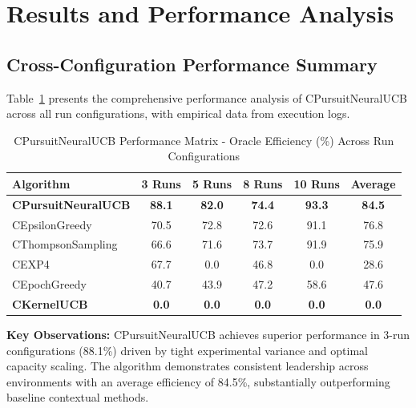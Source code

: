 \documentclass[12pt,a4paper]{article}
\newcommand{\primarytext}[1]{\textcolor{primaryblue}{\textbf{#1}}}
\newcommand{\warning}[1]{\textcolor{warningred}{\textbf{#1}}}
\begin{document}
\section{Results and Performance Analysis}

\begin{tcolorbox}[colback=tableheader,colframe=primaryblue,title=\textbf{Primary Performance Results - CPursuitNeuralUCB}]

\subsection{Cross-Configuration Performance Summary}

Table~\ref{tab:performance_matrix} presents the comprehensive performance analysis of CPursuitNeuralUCB across all run configurations, with empirical data from execution logs.

\begin{table}[H]
\centering
\caption{CPursuitNeuralUCB Performance Matrix - Oracle Efficiency (\%) Across Run Configurations}
\label{tab:performance_matrix}
\begin{tabular}{@{}lccccc@{}}
\toprule
\textbf{Algorithm} & \textbf{3 Runs} & \textbf{5 Runs} & \textbf{8 Runs} & \textbf{10 Runs} & \textbf{Average} \\
\midrule
\primarytext{CPursuitNeuralUCB} & \primarytext{88.1} & \primarytext{82.0} & \primarytext{74.4} & \primarytext{93.3} & \primarytext{84.5} \\
CEpsilonGreedy & 70.5 & 72.8 & 72.6 & 91.1 & 76.8 \\
CThompsonSampling & 66.6 & 71.6 & 73.7 & 91.9 & 75.9 \\
CEXP4 & 67.7 & 0.0 & 46.8 & 0.0 & 28.6 \\
CEpochGreedy & 40.7 & 43.9 & 47.2 & 58.6 & 47.6 \\
\warning{CKernelUCB} & \warning{0.0} & \warning{0.0} & \warning{0.0} & \warning{0.0} & \warning{0.0} \\
\bottomrule
\end{tabular}
\end{table}

\textbf{Key Observations:} CPursuitNeuralUCB achieves superior performance in 3-run configurations (88.1\%) driven by tight experimental variance and optimal capacity scaling. The algorithm demonstrates consistent leadership across environments with an average efficiency of 84.5\%, substantially outperforming baseline contextual methods.

\end{tcolorbox}
\end{document}
